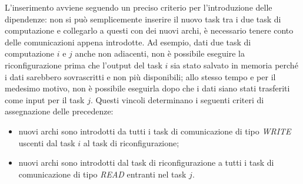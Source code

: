 L'inserimento avviene seguendo un preciso criterio per l'introduzione delle 
dipendenze: non si può semplicemente inserire il nuovo task tra i due task di 
computazione e collegarlo a questi con dei nuovi archi, è necessario tenere 
conto delle comunicazioni appena introdotte. Ad esempio, dati due task di 
computazione $i$ e $j$ anche non adiacenti, non è possibile eseguire la 
riconfigurazione prima che l'output del task $i$ sia stato salvato in memoria 
perch\'e i dati sarebbero sovrascritti e non più disponibili; allo stesso tempo 
e per il medesimo motivo, non è possibile eseguirla dopo che i dati siano stati 
trasferiti come input per il task $j$. Questi vincoli determinano i seguenti
criteri di assegnazione delle precedenze:
\begin{itemize}
 \item nuovi archi sono introdotti da tutti i task di comunicazione di tipo 
\emph{WRITE} uscenti dal task $i$ al task di riconfigurazione;
 \item nuovi archi sono introdotti dal task di riconfigurazione a tutti i task 
di comunicazione di tipo \emph{READ} entranti nel task $j$.
\end{itemize}


